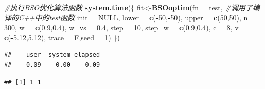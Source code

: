 \documentclass[]{ctexbook}
\newenvironment{Shaded}{\begin{snugshade}}{\end{snugshade}}
\newcommand{\KeywordTok}[1]{\textcolor[rgb]{0.13,0.29,0.53}{\textbf{#1}}}
\newcommand{\DataTypeTok}[1]{\textcolor[rgb]{0.13,0.29,0.53}{#1}}
\newcommand{\DecValTok}[1]{\textcolor[rgb]{0.00,0.00,0.81}{#1}}
\newcommand{\FloatTok}[1]{\textcolor[rgb]{0.00,0.00,0.81}{#1}}
\newcommand{\CommentTok}[1]{\textcolor[rgb]{0.56,0.35,0.01}{\textit{#1}}}
\newcommand{\OtherTok}[1]{\textcolor[rgb]{0.56,0.35,0.01}{#1}}
\newcommand{\OperatorTok}[1]{\textcolor[rgb]{0.81,0.36,0.00}{\textbf{#1}}}
\newcommand{\NormalTok}[1]{#1}
\theoremstyle{definition}
\theoremstyle{definition}
\theoremstyle{definition}
\theoremstyle{remark}
\begin{document}
\begin{Shaded}
\begin{Highlighting}[]
\CommentTok{#执行BSO优化算法函数}
\KeywordTok{system.time}\NormalTok{(\{}
\NormalTok{  fit<-}\KeywordTok{BSOoptim}\NormalTok{(}\DataTypeTok{fn =}\NormalTok{ test, }\CommentTok{#调用了编译的C++中的test函数}
                \DataTypeTok{init =} \OtherTok{NULL}\NormalTok{,}
                \DataTypeTok{lower =} \KeywordTok{c}\NormalTok{(}\OperatorTok{-}\DecValTok{50}\NormalTok{,}\OperatorTok{-}\DecValTok{50}\NormalTok{),}
                \DataTypeTok{upper =} \KeywordTok{c}\NormalTok{(}\DecValTok{50}\NormalTok{,}\DecValTok{50}\NormalTok{),}
                \DataTypeTok{n =} \DecValTok{300}\NormalTok{,}
                \DataTypeTok{w =} \KeywordTok{c}\NormalTok{(}\FloatTok{0.9}\NormalTok{,}\FloatTok{0.4}\NormalTok{),}
                \DataTypeTok{w_vs =} \FloatTok{0.4}\NormalTok{, }
                \DataTypeTok{step =} \DecValTok{10}\NormalTok{,}
                \DataTypeTok{step_w =} \KeywordTok{c}\NormalTok{(}\FloatTok{0.9}\NormalTok{,}\FloatTok{0.4}\NormalTok{),}
                \DataTypeTok{c =} \DecValTok{8}\NormalTok{,}
                \DataTypeTok{v =} \KeywordTok{c}\NormalTok{(}\OperatorTok{-}\FloatTok{5.12}\NormalTok{,}\FloatTok{5.12}\NormalTok{),}
                \DataTypeTok{trace =}\NormalTok{ F,}\DataTypeTok{seed =} \DecValTok{1}\NormalTok{)}
\NormalTok{\})}
\end{Highlighting}
\end{Shaded}

\begin{verbatim}
##    user  system elapsed 
##    0.09    0.00    0.09
\end{verbatim}

\begin{Shaded}
\end{Shaded}

\begin{verbatim}
## [1] 1 1
\end{verbatim}

\begin{Shaded}
\end{Shaded}
\end{document}

